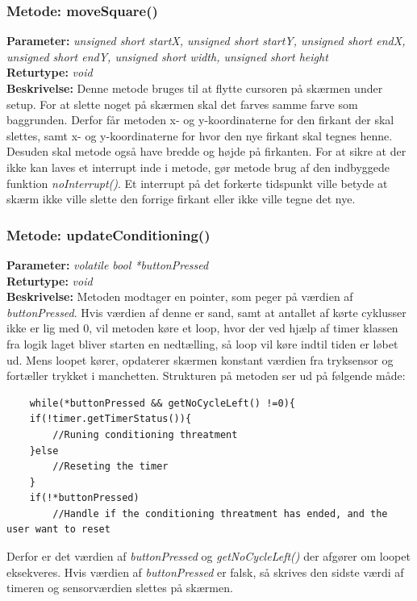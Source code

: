 \subsubsection{Metode: moveSquare()}
\textbf{Parameter: } \textit{unsigned short startX, unsigned short startY, unsigned short endX, unsigned short endY, unsigned short width, unsigned short height}
\\ \textbf{Returtype: } \textit{void}
\\ \textbf{Beskrivelse: } Denne metode bruges til at flytte cursoren på skærmen under setup. For at slette noget på skærmen skal det farves samme farve som baggrunden. Derfor får metoden  x- og y-koordinaterne for den firkant der skal slettes, samt x- og y-koordinaterne for hvor den nye firkant skal tegnes henne. Desuden skal metode også have bredde og højde på firkanten. For at sikre at der ikke kan laves et interrupt inde i metode, gør metode brug af den indbyggede funktion \textit{noInterrupt()}. Et interrupt på det forkerte tidspunkt ville betyde at skærm ikke ville slette den forrige firkant eller ikke ville tegne det nye. 

\subsubsection{Metode: updateConditioning()}
\textbf{Parameter: } \textit{volatile bool *buttonPressed}
\\ \textbf{Returtype: } \textit{void}
\\ \textbf{Beskrivelse: } Metoden modtager en pointer, som peger på værdien af \textit{buttonPressed}. Hvis værdien af denne er sand, samt at antallet af kørte cyklusser ikke er lig med 0, vil metoden køre et loop, hvor der ved hjælp af timer klassen fra logik laget bliver starten en nedtælling, så loop vil køre indtil tiden er løbet ud. Mens loopet kører, opdaterer skærmen konstant værdien fra tryksensor og fortæller trykket i manchetten.  Strukturen på metoden ser ud på følgende måde: 
\begin{lstlisting}
	while(*buttonPressed && getNoCycleLeft() !=0){
	if(!timer.getTimerStatus()){
		//Runing conditioning threatment 
	}else
		//Reseting the timer
	}
	if(!*buttonPressed)
		//Handle if the conditioning threatment has ended, and the user want to reset
\end{lstlisting}
Derfor er det værdien af \textit{buttonPressed} og \textit{getNoCycleLeft()} der afgører om loopet eksekveres. Hvis værdien af \textit{buttonPressed} er falsk, så skrives den sidste værdi af timeren og sensorværdien slettes på skærmen.  \\

